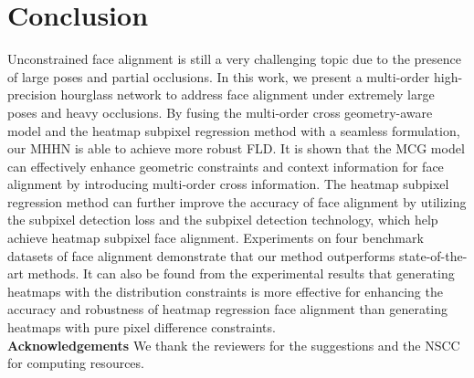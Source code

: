 \documentclass[journal]{IEEEtran}
\begin{document}
\section{Conclusion}
Unconstrained face alignment is still a very challenging topic due to the presence of large poses and partial occlusions. In this work, we present a multi-order high-precision hourglass network to address face alignment under extremely large poses and heavy occlusions. By fusing the multi-order cross geometry-aware model and the heatmap subpixel regression method with a seamless formulation, our MHHN is able to achieve more robust FLD. It is shown that the MCG model can effectively enhance geometric constraints and context information for face alignment by introducing multi-order cross information. The heatmap subpixel regression method can further improve the accuracy of face alignment by utilizing the subpixel detection loss and the subpixel detection technology, which help achieve heatmap subpixel face alignment. Experiments on four benchmark datasets of face alignment demonstrate that our method outperforms state-of-the-art methods. It can also be found from the experimental results that generating heatmaps with the distribution constraints is more effective for enhancing the accuracy and robustness of heatmap regression face alignment than generating heatmaps with pure pixel difference constraints.
\\\textbf{Acknowledgements} We thank the reviewers for the suggestions and the NSCC for computing resources.







\ifCLASSOPTIONcaptionsoff
  \newpage
\fi
















\end{document}
